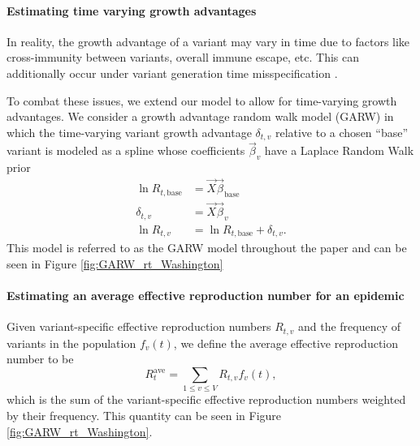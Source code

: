 \paragraph{Estimating time varying growth advantages}
In reality, the growth advantage of a variant may vary in time due to factors like cross-immunity between variants, overall immune escape, etc.
This can additionally occur under variant generation time misspecification \cite{Park2021.05.03.21256545}.

To combat these issues, we extend our model to allow for time-varying growth advantages.
We consider a growth advantage random walk model (GARW) in which the time-varying variant growth advantage $\delta_{t,v}$ relative to a chosen ``base'' variant is modeled as a spline whose coefficients $\vec{\beta}_{v}$ have a Laplace Random Walk prior
\begin{align*}
  \ln R_{t, \text{base}} &= \vec{X} \vec{\beta}_{\text{base}}\\
  \delta_{t, v} &= \vec{X} \vec{\beta}_{v}\\
  \ln R_{t, v} &= \ln R_{t, \text{base}} + \delta_{t, v}.
\end{align*}
This model is referred to as the GARW model throughout the paper and can be seen in Figure \ref{fig:GARW_rt_Washington}

\paragraph{Estimating an average effective reproduction number for an epidemic}

Given variant-specific effective reproduction numbers $R_{t,v}$ and the frequency of variants in the population $f_{v}(t)$, we define the average effective reproduction number to be
\begin{equation}
  R_{t}^{\text{ave}} = \sum_{1\leq v \leq V} R_{t,v}f_{v}(t),
\end{equation}
which is the sum of the variant-specific effective reproduction numbers weighted by their frequency. This quantity can be seen in Figure \ref{fig:GARW_rt_Washington}.

%
%

